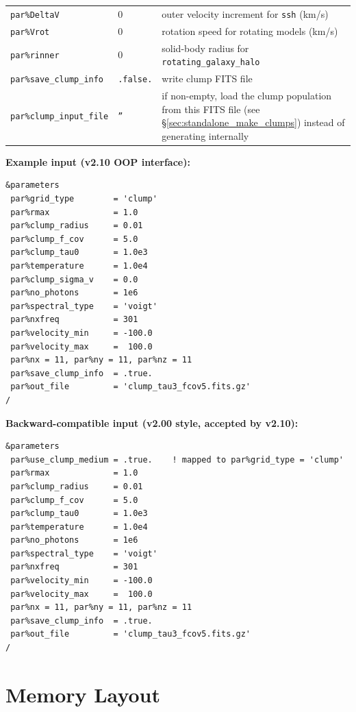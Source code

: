 \documentclass[english,a4paper]{my_memo}
\begin{document}
\begin{tabularx}{\linewidth}{llX}
\texttt{par\%DeltaV}            & $0$  & outer velocity increment for \texttt{ssh} (km/s) \\
\texttt{par\%Vrot}              & $0$  & rotation speed for rotating models (km/s) \\
\texttt{par\%rinner}            & $0$  & solid-body radius for \texttt{rotating\_galaxy\_halo} \\
\texttt{par\%save\_clump\_info} & \texttt{.false.} & write clump FITS file \\
\texttt{par\%clump\_input\_file} & \texttt{''} & if non-empty, load the clump population from this FITS file (see \S\ref{sec:standalone_make_clumps}) instead of generating internally \\
\hline
\end{tabularx}

\smallskip\noindent\textbf{Example input (v2.10 OOP interface):}
\begin{lstlisting}
&parameters
 par%grid_type        = 'clump'
 par%rmax             = 1.0
 par%clump_radius     = 0.01
 par%clump_f_cov      = 5.0
 par%clump_tau0       = 1.0e3
 par%temperature      = 1.0e4
 par%clump_sigma_v    = 0.0
 par%no_photons       = 1e6
 par%spectral_type    = 'voigt'
 par%nxfreq           = 301
 par%velocity_min     = -100.0
 par%velocity_max     =  100.0
 par%nx = 11, par%ny = 11, par%nz = 11
 par%save_clump_info  = .true.
 par%out_file         = 'clump_tau3_fcov5.fits.gz'
/
\end{lstlisting}

\smallskip\noindent\textbf{Backward-compatible input (v2.00 style, accepted by v2.10):}
\begin{lstlisting}
&parameters
 par%use_clump_medium = .true.    ! mapped to par%grid_type = 'clump'
 par%rmax             = 1.0
 par%clump_radius     = 0.01
 par%clump_f_cov      = 5.0
 par%clump_tau0       = 1.0e3
 par%temperature      = 1.0e4
 par%no_photons       = 1e6
 par%spectral_type    = 'voigt'
 par%nxfreq           = 301
 par%velocity_min     = -100.0
 par%velocity_max     =  100.0
 par%nx = 11, par%ny = 11, par%nz = 11
 par%save_clump_info  = .true.
 par%out_file         = 'clump_tau3_fcov5.fits.gz'
/
\end{lstlisting}

\section{Memory Layout}
\end{document}
